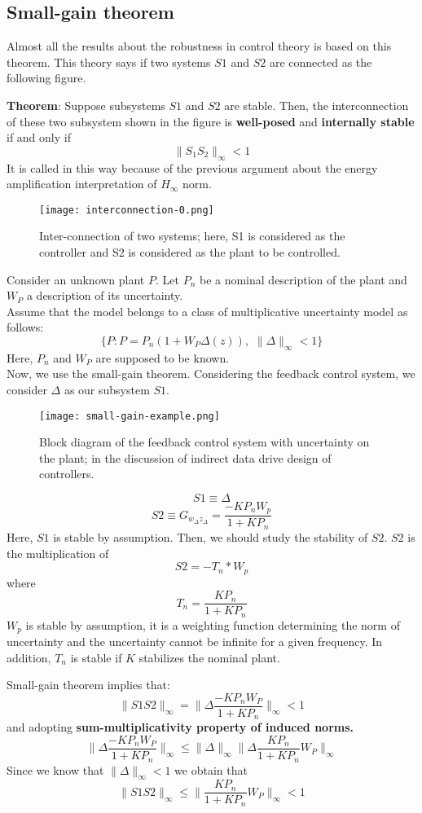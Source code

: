 \subsection{Small-gain theorem}
Almost all the results about the robustness in control theory is based on this theorem. This theory says if two systems $S1$ and $S2$ are connected as the following figure. 

\textbf{Theorem}: Suppose subsystems $S1$ and $S2$ are stable. Then, the interconnection of these two subsystem shown in the figure is \textbf{well-posed} and \textbf{internally stable} if and only if 
\[
\|S_1S_2\|_\infty < 1
\]
It is called in this way because of the previous argument about the energy amplification interpretation of $H_\infty$ norm. 
 \begin{figure}[H]
    \centering
    \texttt{[image: interconnection-0.png]}
    \caption{Inter-connection of two systems; here, S1 is considered as the controller and S2 is considered as the plant to be controlled.}
 \end{figure}


\begin{example}[Example]
Consider an unknown plant $P$. Let $P_n$ be a nominal description of the plant and $W_P$ a description of its uncertainty.\\
Assume that the model belongs to a class of multiplicative uncertainty model as follows:
\[
\{P: P = P_n (1 + W_P \Delta(z)),\,\,\|\Delta\|_\infty <1 \}
\]
Here, $P_n$ and $W_P$ are supposed to be known. \\

Now, we use the small-gain theorem. Considering the feedback control system, we consider $\Delta$ as our subsystem $S1$. 
 \begin{figure}[H]
    \centering
    \texttt{[image: small-gain-example.png]}
    \caption{Block diagram of the feedback control system with uncertainty on the plant; in the discussion of indirect data drive design of controllers.}
 \end{figure}
 \[
 S1 \equiv \Delta \]
 \[
 S2 \equiv G_{w_\Delta z_\Delta} = \frac{-KP_nW_p}{1+KP_n}
 \]
 Here, $S1$ is stable by assumption.  Then, we should study the stability of $S2$. $S2$ is the multiplication of
 \[
 S2 = -T_n*W_p
 \]
 where
 \[
 T_n = \frac{KP_n}{1 + K P_n}
 \]
$W_p$ is stable by assumption, it is a weighting function determining the norm of uncertainty and the uncertainty cannot be infinite for a given frequency. In addition, $T_n$ is stable if $K$ stabilizes the nominal plant.
 
 Small-gain theorem implies that:
 \[
\|S1S2\|_\infty = \|\Delta\frac{-KP_nW_P}{1 + KP_n}\|_\infty < 1
 \]
 and adopting\textbf{ sum-multiplicativity property of induced norms.} 
 \[
 \|\Delta\frac{-KP_nW_P}{1 + KP_n}\|_\infty \leq\|\Delta\|_\infty \|\Delta\frac{KP_n}{1 + KP_n}W_P\|_\infty
 \]
 Since we know that $\|\Delta\|_\infty<1$ we obtain that 
 \[
\|S1S2\|_\infty \leq \|\frac{KP_n}{1 + KP_n}W_P\|_\infty < 1
 \]
 \end{example}
 
